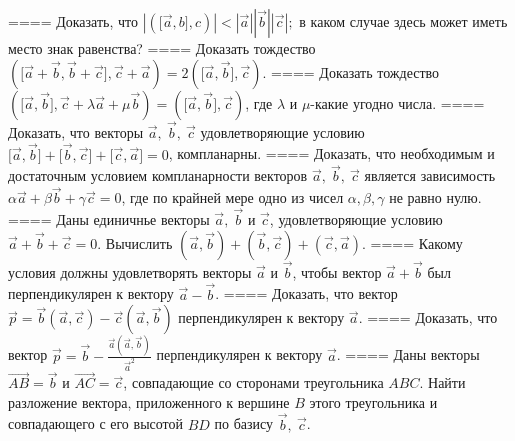 ====
Доказать, что \(|(\lbrack\overrightarrow{a},b\rbrack,c)| <  |\overrightarrow{a}||\overrightarrow{b}||\overrightarrow{c}|;\) в каком случае здесь может иметь место знак равенства?
====
Доказать тождество \((\lbrack\overrightarrow{a} + \overrightarrow{b},\overrightarrow{b} + \overrightarrow{c}\rbrack,\overrightarrow{c} + \overrightarrow{a}) = 2(\lbrack\overrightarrow{a},\overrightarrow{b}\rbrack,\overrightarrow{c})\).
====
Доказать тождество \((\lbrack\overrightarrow{a},\overrightarrow{b}\rbrack,\overrightarrow{c} + \lambda\overrightarrow{a} + \mu\overrightarrow{b}) = (\lbrack\overrightarrow{a},\overrightarrow{b}\rbrack,\overrightarrow{c})\), где \(\lambda\) и \(\mu\)-какие угодно числа.
====
Доказать, что векторы \(\overrightarrow{a},\ \overrightarrow{b},\ \overrightarrow{c}\) удовлетворяющие условию \(\lbrack\overrightarrow{a},\overrightarrow{b}\rbrack + \lbrack\overrightarrow{b},\overrightarrow{c}\rbrack + \lbrack\overrightarrow{c},\overrightarrow{a}\rbrack = 0\), компланарны.
====
Доказать, что необходимым и достаточным условием компланарности векторов \(\overrightarrow{a},\ \overrightarrow{b},\ \overrightarrow{c}\) является зависимость \(\alpha\overrightarrow{a} + \beta\overrightarrow{b} + \gamma\overrightarrow{c} = 0\), где по крайней мере одно из чисел \(\alpha,\beta,\gamma\) не равно нулю.
====
Даны единичнье векторы \(\overrightarrow{a},\ \overrightarrow{b}\) и \(\overrightarrow{c}\), удовлетворяющие условию \(\overrightarrow{a} + \overrightarrow{b} + \overrightarrow{c} = 0\). Вычислить \(\left( \overrightarrow{a},\overrightarrow{b} \right) + \left( \overrightarrow{b},\overrightarrow{c} \right) + \left( \overrightarrow{c},\overrightarrow{a} \right)\).
====
Какому условия должны удовлетворять векторы \(\overrightarrow{a}\) и \(\overrightarrow{b}\), чтобы вектор \(\overrightarrow{a} + \overrightarrow{b}\) был перпендикулярен к вектору \(\overrightarrow{a} - \overrightarrow{b}\).
====
Доказать, что вектор \(\overrightarrow{p} = \overrightarrow{b}(\overrightarrow{a},\overrightarrow{c}) - \overrightarrow{c}(\overrightarrow{a},\overrightarrow{b})\) перпендикулярен к вектору \(\overrightarrow{a}\).
====
Доказать, что вектор \(\overrightarrow{p} = \overrightarrow{b} - \frac{\overrightarrow{a}(\overrightarrow{a},\overrightarrow{b})}{{\overrightarrow{a}}^{2}}\) перпендикулярен к вектору \(\overrightarrow{a}\).
====
Даны векторы \(\overrightarrow{AB} = \overrightarrow{b}\) и \(\overrightarrow{AC} = \overrightarrow{c}\), совпадающие со сторонами треугольника \(ABC\). Найти разложение вектора, приложенного к вершине \(B\) этого треугольника и совпадающего с его высотой \(BD\) по базису \(\overrightarrow{b},\ \overrightarrow{c}\).
